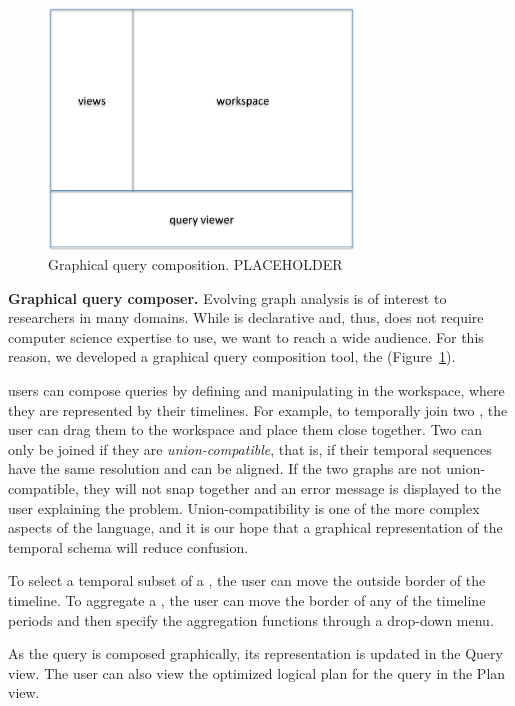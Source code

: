\begin{figure}
\begin{center}
\includegraphics[width=3.2in]{figs/ui.pdf}
\caption{Graphical query composition. PLACEHOLDER}
\label{fig:ui}
\end{center}
\end{figure}

{\bf Graphical query composer.} Evolving graph analysis is of interest
to researchers in many domains.  While \ql is declarative and, thus,
does not require computer science expertise to use, we want to reach a
wide audience.  For this reason, we developed a graphical query
composition tool, the \qlui (Figure~\ref{fig:ui}).

\qlui users can compose queries by defining and manipulating \tgs in
the workspace, where they are represented by their timelines.  For
example, to temporally join two \tgs, the user can drag them to the
workspace and place them close together.  Two \tgs can only be joined
if they are {\em union-compatible}, that is, if their temporal
sequences have the same resolution and can be aligned.  If the two
graphs are not union-compatible, they will not snap together and an
error message is displayed to the user explaining the problem.
Union-compatibility is one of the more complex aspects of the
language, and it is our hope that a graphical representation of the
\tg temporal schema will reduce confusion.

To select a temporal subset of a \tg, the user can move the outside
border of the timeline.  To aggregate a \tg, the user can move the
border of any of the timeline periods and then specify the aggregation
functions through a drop-down menu.

As the query is composed graphically, its \ql representation is
updated in the Query view.  The user can also view the optimized
logical plan for the query in the Plan view.
